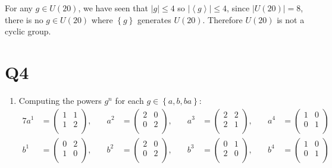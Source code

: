 \documentclass[a4paper, 11pt]{article}
\def\set#1{\left\{ #1 \right\}}
\def\gen#1{\left\langle#1 \right\rangle}
\def\abs#1{\left|#1\right|}
\begin{document}
\begin{enumerate}[label=(\alph*)]
	For any $g\in U(20)$, we have seen that $|g|\leq 4$ so $\abs{\gen{g}}\leq 4$, since $\abs{U(20)}=8$, there is no $g\in U(20)$ where $\set{g}$ generates $U(20)$. Therefore $U(20)$ is not a cyclic group. 
\end{enumerate}

\pagebreak
\section*{Q4}
\begin{enumerate}[label=(\alph*)]
	\item Computing the powers $g^n$ for each $g\in\set{a,b,ba}$:
	\begin{alignat*}{7}
	a^1&=\begin{pmatrix}
		1 & 1 \\
		1 & 2 \\
	\end{pmatrix},\quad
	&a^2&=\begin{pmatrix}
		2 & 0 \\
		0 & 2 \\
	\end{pmatrix},\quad
	&a^3&=\begin{pmatrix}
		2 & 2 \\
		2 & 1 \\
	\end{pmatrix},\quad
	&a^4&=\begin{pmatrix}
		1 & 0 \\
		0 & 1 \\
	\end{pmatrix}
	\\
	b^1&=\begin{pmatrix}
		0 & 2 \\
		1 & 0 \\
	\end{pmatrix},\quad
	&b^2&=\begin{pmatrix}
		2 & 0 \\
		0 & 2 \\
	\end{pmatrix},\quad
	&b^3&=\begin{pmatrix}
		0 & 1 \\
		2 & 0 \\
	\end{pmatrix},\quad
	&b^4&=\begin{pmatrix}
		1 & 0 \\
		0 & 1 \\
	\end{pmatrix}
	\\

\end{alignat*}
\end{enumerate}
\end{document}
